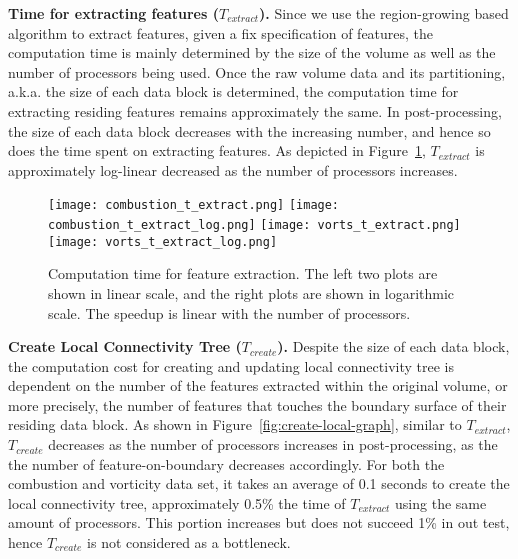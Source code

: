 

\textbf{Time for extracting features ($T_{extract}$).}
%
Since we use the region-growing based algorithm to extract features, given a fix specification of features, the computation time is mainly determined by the size of the volume as well as the number of processors being used. Once the raw volume data and its partitioning, a.k.a. the size of each data block is determined, the computation time for extracting residing features remains approximately the same. In post-processing, the size of each data block decreases with the increasing number, and hence so does the time spent on extracting features. As depicted in Figure~\ref{fig:feature-extraction}, $T_{extract}$ is approximately log-linear decreased as the number of processors increases.

\begin{figure}[t]
\centering
\texttt{[image: combustion\_t\_extract.png]}
\texttt{[image: combustion\_t\_extract\_log.png]}
\texttt{[image: vorts\_t\_extract.png]}
\texttt{[image: vorts\_t\_extract\_log.png]}
\caption{Computation time for feature extraction. The left two plots are shown in linear scale, and the right plots are shown in logarithmic scale. The speedup is linear with the number of processors.}
\label{fig:feature-extraction}
\end{figure}

\textbf{Create Local Connectivity Tree ($T_{create}$).}
%
Despite the size of each data block, the computation cost for creating and updating local connectivity tree is dependent on the number of the features extracted within the original volume, or more precisely, the number of features that touches the boundary surface of their residing data block. As shown in Figure~\ref{fig:create-local-graph}, similar to $T_{extract}$, $T_{create}$ decreases as the number of processors increases in post-processing, as the the number of feature-on-boundary decreases accordingly. For both the combustion and vorticity data set, it takes an average of 0.1 seconds to create the local connectivity tree, approximately 0.5\% the time of $T_{extract}$ using the same amount of processors. This portion increases but does not succeed 1\% in out test, hence $T_{create}$ is not considered as a bottleneck. %

